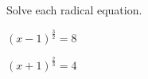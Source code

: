 \begin{exercise}
	Solve each radical equation.

\begin{enumerate*}[label={(\arabic*)~}]
	\item $(x-1)^{\frac32}=8$
	\item $(x+1)^{\frac23}=4$
	\hfill\null
\end{enumerate*}
\end{exercise}


\vfill
\begin{center} \hfill
{}
\end{center}